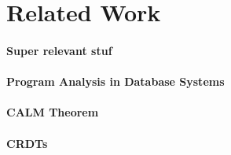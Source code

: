 \section{Related Work}

\paragraph{Super relevant stuf}

\paragraph{Program Analysis in Database Systems}

\paragraph{CALM Theorem}
\cite{alvaro2013declarative}
\cite{ameloot2013relational}
\cite{ameloot2016weaker}
\cite{hellerstein2010declarative}
\cite{alvaro2011dedalus}
\cite{alvaro2010boom}
\cite{alvaro2011consistency}
\cite{conway2012logic}
\cite{zinn2012win}

\paragraph{CRDTs}

